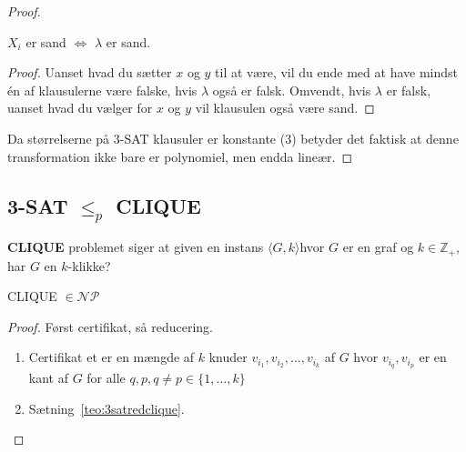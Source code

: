 \begin{proof}
	\begin{claim}
		$X_{i}$ er sand $\iff$ \(\lambda\) er sand.
	\end{claim}

	\begin{proof}
		Uanset hvad du sætter $x$ og $y$ til at være, vil du ende med at have mindst én af klausulerne være falske, hvis \(\lambda\) også er falsk. Omvendt, hvis \(\lambda\) er falsk, uanset hvad du vælger for $x$ og $y$ vil klausulen også være sand.
	\end{proof}

	Da størrelserne på 3-SAT klausuler er konstante (3) betyder det faktisk at denne transformation ikke bare er polynomiel, men endda lineær.
\end{proof}

\subsection{3-SAT $\le_{p}$ CLIQUE}%
\label{subsec:label}

\textbf{CLIQUE} problemet siger at given en instans \(\langle G, k\rangle \)hvor $G$ er en graf og $k \in \mathbb{Z}_{+}$, har $G$  en $k$-klikke?

\begin{theorem}
	CLIQUE \(\in \mathcal{NP}\)
\end{theorem}

\begin{proof}
	Først certifikat, så reducering.
	\begin{enumerate}
		\item Certifikat et er en mængde af $k$ knuder $v_{i_{1}}, v_{i_{2}}, \ldots, v_{i_{k}}$ af $G$ hvor $v_{i_{q}}, v_{i_{p}}$ er en kant af $G$ for alle $q,p, q \ne p \in \{1, \ldots, k\}$
		\item Sætning~\ref{teo:3satredclique}.
	\end{enumerate}
\end{proof}

